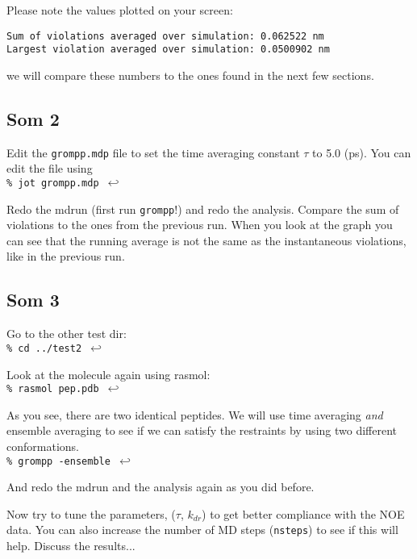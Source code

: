 \documentclass[11pt,dvips]{article}
\renewcommand{\type}[1]{\\ {\tt \% #1 $\hookleftarrow$}}
\begin{document}
Please note the values plotted on your screen:
\begin{verbatim}
Sum of violations averaged over simulation: 0.062522 nm
Largest violation averaged over simulation: 0.0500902 nm
\end{verbatim}
we will compare these numbers to the ones found in the next few sections.

\subsection{Som 2}
Edit the {\tt grompp.mdp} file to set the time averaging constant $\tau$ to
5.0 (ps). You can edit the file using
\type{jot grompp.mdp}

Redo the mdrun (first run {\tt grompp}!) and redo the analysis.
Compare the sum of violations to the ones from the previous run.
When you look at the graph you can see that the running average is not the
same as the instantaneous violations, like in the previous run.

\subsection{Som 3}
Go to the other test dir:
\type{cd ../test2}

Look at the molecule again using rasmol:
\type{rasmol pep.pdb}

As you see, there are two identical peptides. We will use 
time averaging {\em and} ensemble averaging
to see if we can satisfy the restraints by using two different
conformations.
\type{grompp -ensemble}

And redo the mdrun and the analysis again as you did before.

Now try to tune the parameters, ($\tau$, $k_{dr}$) to get better compliance
with the NOE data. You can also increase the number of MD steps
({\tt nsteps}) to see if this will help. Discuss the results...



\end{document}
